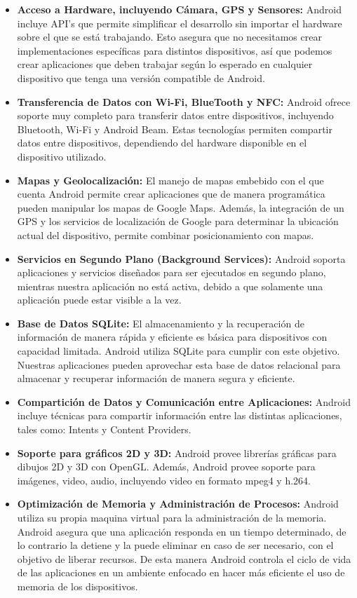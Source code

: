 \begin{itemize}
	\item \textbf{Acceso a Hardware, incluyendo Cámara, GPS y Sensores: }Android incluye API’s que permite simplificar el desarrollo sin importar el hardware sobre el que se está trabajando. Esto asegura que no necesitamos crear implementaciones específicas para distintos dispositivos, así que podemos crear aplicaciones que deben trabajar según lo esperado en cualquier dispositivo que tenga una versión compatible de Android.
	\item \textbf{Transferencia de Datos con Wi-Fi, BlueTooth y NFC: } Android ofrece soporte muy completo para transferir datos entre dispositivos, incluyendo Bluetooth, Wi-Fi y Android Beam. Estas tecnologías permiten compartir datos entre dispositivos, dependiendo del hardware disponible en el dispositivo utilizado.
	\item \textbf{Mapas y Geolocalización: }El manejo de mapas embebido con el que cuenta Android permite crear aplicaciones que de manera programática pueden manipular los mapas de Google Maps. Además, la integración de un GPS y los servicios de localización de Google para determinar la ubicación actual del dispositivo, permite combinar posicionamiento con mapas.
	\item \textbf{Servicios en Segundo Plano (Background Services): }Android soporta aplicaciones y servicios diseñados para ser ejecutados en segundo plano, mientras nuestra aplicación no está activa, debido a que solamente una aplicación puede estar visible a la vez. 
	\item \textbf{Base de Datos SQLite: }El almacenamiento y la recuperación de información de manera rápida y eficiente es básica para dispositivos con capacidad limitada. Android utiliza SQLite para cumplir con este objetivo. Nuestras aplicaciones pueden aprovechar esta base de datos relacional para almacenar y recuperar información de manera segura y eficiente.
	\item \textbf{Compartición de Datos y Comunicación entre Aplicaciones: }Android incluye técnicas para compartir información entre las distintas aplicaciones, tales como: Intents y Content Providers.
	\item \textbf{ Soporte para gráficos 2D y 3D: }Android provee librerías gráficas para dibujos 2D y 3D con OpenGL. Además, Android provee soporte para imágenes, video, audio, incluyendo video en formato mpeg4 y h.264.
	\item \textbf{Optimización de Memoria y Administración de Procesos: }Android utiliza su propia maquina virtual para la administración de la memoria. Android asegura que una aplicación responda en un tiempo determinado, de lo contrario la detiene y la puede eliminar en caso de ser necesario, con el objetivo de liberar recursos. De esta manera Android controla el ciclo de vida de las aplicaciones en un ambiente enfocado en hacer más eficiente el uso de memoria de los dispositivos. \cite{presentacionAndroid}
\end{itemize}
